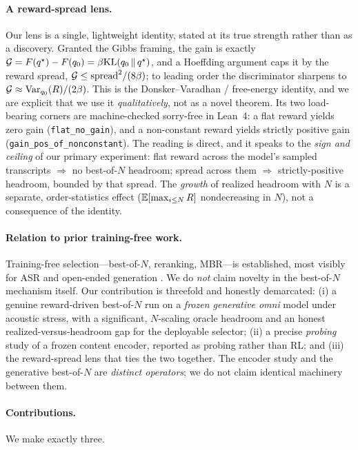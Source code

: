 \paragraph{A reward-spread lens.}
Our lens is a single, lightweight identity, stated at its true strength rather than as a discovery. Granted the Gibbs framing, the gain is exactly $\mathcal{G}=F\!\left(q^{\star}\right)-F\!\left(q_{0}\right)=\beta\mathrm{KL}\!\left(q_{0} \,\|\, q^{\star}\right)$, and a Hoeffding argument caps it by the reward spread, $\mathcal{G}\le\mathrm{spread}^2/(8\beta)$; to leading order the discriminator sharpens to $\mathcal{G}\approx\mathrm{Var}_{q_{0}}(R)/(2\beta)$. This is the Donsker--Varadhan / free-energy identity, and we are explicit that we use it \emph{qualitatively}, not as a novel theorem. Its two load-bearing corners are machine-checked sorry-free in Lean~4: a flat reward yields zero gain (\texttt{flat\_no\_gain}), and a non-constant reward yields strictly positive gain (\texttt{gain\_pos\_of\_nonconstant}). The reading is direct, and it speaks to the \emph{sign and ceiling} of our primary experiment: flat reward across the model's sampled transcripts $\Rightarrow$ no best-of-$N$ headroom; spread across them $\Rightarrow$ strictly-positive headroom, bounded by that spread. The \emph{growth} of realized headroom with $N$ is a separate, order-statistics effect ($\mathbb{E}[\max_{i\le N}R]$ nondecreasing in $N$), not a consequence of the identity.

\paragraph{Relation to prior training-free work.}
Training-free selection---best-of-$N$, reranking, MBR---is established, most visibly for ASR and open-ended generation \citep{beirami2024bon,mbrasr2025,ichihara2025mbr}. We do \emph{not} claim novelty in the best-of-$N$ mechanism itself. Our contribution is threefold and honestly demarcated: (i) a genuine reward-driven best-of-$N$ run on a \emph{frozen generative omni} model under acoustic stress, with a significant, $N$-scaling oracle headroom and an honest realized-versus-headroom gap for the deployable selector; (ii) a precise \emph{probing} study of a frozen content encoder, reported as probing rather than RL; and (iii) the reward-spread lens that ties the two together. The encoder study and the generative best-of-$N$ are \emph{distinct operators}; we do not claim identical machinery between them.

\paragraph{Contributions.}
We make exactly three.

